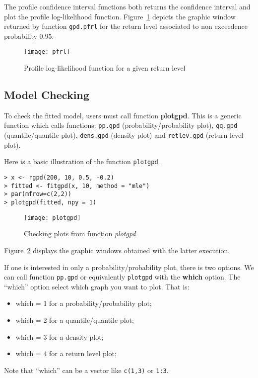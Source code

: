 \documentclass[11pt,a4paper]{article}
\numberwithin{equation}{section}
\begin{document}
The profile confidence interval functions both returns the confidence
interval and plot the profile log-likelihood
function. Figure~\ref{fig:pfrl} depicts the graphic window returned by
function \verb|gpd.pfrl| for the return level associated to non
exceedence probability 0.95.
\begin{figure}
  \centering
  \texttt{[image: pfrl]}
  \caption{Profile log-likelihood function for a given return level}
  \label{fig:pfrl}
\end{figure}

\subsection{Model Checking}
\label{subsec:modCheck}


To check the fitted model, users must call function
\textbf{plotgpd}. This is a generic function which calls functions:
\verb|pp.gpd| (probability/probability plot), \verb|qq.gpd|
(quantile/quantile plot), \verb|dens.gpd| (density plot) and
\verb|retlev.gpd| (return level plot).

Here is a basic illustration of the function \verb|plotgpd|.
\begin{verbatim}
> x <- rgpd(200, 10, 0.5, -0.2)
> fitted <- fitgpd(x, 10, method = "mle")
> par(mfrow=c(2,2))
> plotgpd(fitted, npy = 1)
\end{verbatim}

\begin{figure}
  \centering
  \texttt{[image: plotgpd]}
  \caption{Checking plots from function \emph{plotgpd}}
  \label{fig:plotgpd}
\end{figure}

Figure~\ref{fig:plotgpd} displays the graphic windows obtained with
the latter execution.

If one is interested in only a probability/probability plot, there is
two options. We can call function \verb|pp.gpd| or equivalently
\verb|plotgpd| with the \textbf{which} option. The ``which'' option
select which graph you want to plot. That is:
\begin{itemize}
\item{which = 1} for a probability/probability plot;
\item{which = 2} for a quantile/quantile plot;
\item{which = 3} for a density plot;
\item{which = 4} for a return level plot;
\end{itemize}
Note that ``which'' can be a vector like \verb|c(1,3)| or \verb|1:3|.
\end{document}
